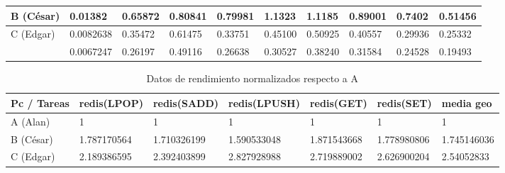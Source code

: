 \documentclass{article}
\begin{document}
\begin{enumerate}
{\begin{table}[]
\begin{tabular}{|l|l|l|l|l|l|l|l|l|l|}
                \cellcolor[HTML]{FFFE65}{\color[HTML]{000000}}
                B (César) & 0.01382 & 0.65872 & 0.80841 & 0.79981 & 1.1323 
                & 1.1185 & 0.89001 & 0.7402 & 0.51456 \\ \hline
    
                
    
                \cellcolor[HTML]{34FF34}{\color[HTML]{000000}}
                C (Edgar) & 0.0082638 & 0.35472 & 0.61475 & 0.33751 & 0.45100 
                & 0.50925 & 0.40557 & 0.29936 & 0.25332\\ \hline
    
                
    
                \cellcolor[HTML]{9698ED}{\color[HTML]{000000} 
                D(Sandra)} & 0.0067247 & 0.26197 & 0.49116 & 0.26638 & 0.30527 
                & 0.38240 & 0.31584 & 0.24528 & 0.19493 \\ \hline
    
                
                \end{tabular}
            \end{table}
    
            \begin{table}[]
                \caption*{Datos de rendimiento normalizados respecto a A}
                \begin{tabular}{|l|l|l|l|l|l|l|}
                \toprule
                    Pc / Tareas 
                    & \cellcolor[HTML]{DAE8FC}redis(LPOP) 
                    & \cellcolor[HTML]{DAE8FC}redis(SADD) 
                    & \cellcolor[HTML]{DAE8FC}redis(LPUSH) 
                    & \cellcolor[HTML]{DAE8FC}redis(GET)
                    & \cellcolor[HTML]{DAE8FC}redis(SET) 
                    & \cellcolor[HTML]{DAE8FC}media geo \\ \hline
    
                    \cellcolor[HTML]{F8A102}{\color[HTML]{000000}} 
                    A (Alan) & 1 & 1 & 1 & 1 & 1 & 1 \\ \hline
    
                    \cellcolor[HTML]{FFFE65}{\color[HTML]{000000}}
                    B (César) & 1.787170564 & 1.710326199 & 1.590533048 
                    & 1.871543668 & 1.778980806 & 1.745146036\\ \hline
    
    
                    \cellcolor[HTML]{34FF34}{\color[HTML]{000000}} 
                    C (Edgar) & 2.189386595 & 2.392403899 & 2.827928988 
                    & 2.719889002 & 2.626900204 & 2.54052833\\ \hline
    

\end{tabular}
\end{table}}
\end{enumerate}
\end{document}
